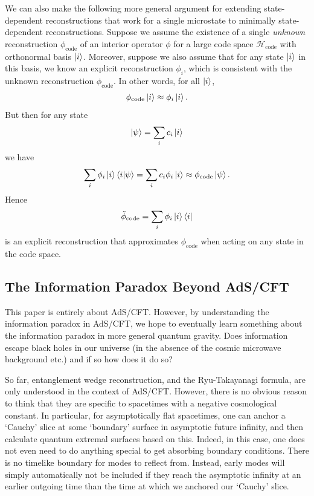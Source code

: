 \documentclass[11pt,a4paper]{article}
\begin{document}
We can also make the following more general argument for extending state-dependent reconstructions that work for a single microstate to minimally state-dependent reconstructions. Suppose we assume the existence of a single \emph{unknown} reconstruction $\phi_\text{code}$ of an interior operator $\phi$ for a large code space $\mathcal{H}_\text{code}$ with orthonormal basis $\ket{i}$. Moreover, suppose we also assume that for any state $\ket{i}$ in this basis, we know an explicit reconstruction $\phi_i$, which is consistent with the unknown reconstruction $\phi_\text{code}$. In other words, for all $\ket{i}$,
\begin{align}
\phi_\text{code} \ket{i} \approx \phi_i \ket{i}.
\end{align}
But then for any state 
$$\ket{\psi} = \sum_i c_i \ket{i}$$
we have
\begin{align}
\sum_i \phi_i \ket{i}\braket{i|\psi} = \sum_i c_i \phi_i \ket{i} \approx \phi_\text{code} \ket{\psi}.
\end{align}
Hence
\begin{align}
\tilde{\phi}_\text{code} = \sum_i \phi_i \ket{i}\bra{i}
\end{align}
is an explicit reconstruction that approximates $\phi_\text{code}$ when acting on any state in the code space.

\subsection{The Information Paradox Beyond AdS/CFT}
This paper is entirely about AdS/CFT. However, by understanding the information paradox in AdS/CFT, we hope to eventually learn something about the information paradox in more general quantum gravity. Does information escape black holes in our universe (in the absence of the cosmic microwave background etc.) and if so how does it do so?

So far, entanglement wedge reconstruction, and the Ryu-Takayanagi formula, are only understood in the context of AdS/CFT. However, there is no obvious reason to think that they are specific to spacetimes with a negative cosmological constant. In particular, for asymptotically flat spacetimes, one can anchor a `Cauchy' slice at some `boundary' surface in asymptotic future infinity, and then calculate quantum extremal surfaces based on this. Indeed, in this case, one does not even need to do anything special to get absorbing boundary conditions. There is no timelike boundary for modes to reflect from. Instead, early modes will simply automatically not be included if they reach the asymptotic infinity at an earlier outgoing time than the time at which we anchored our `Cauchy' slice.
\end{document}
